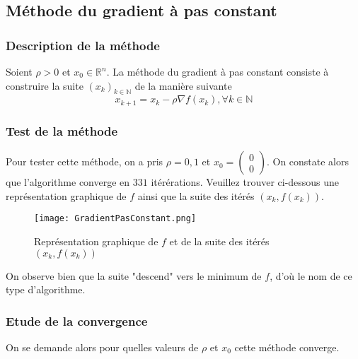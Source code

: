 \documentclass[9pt,a4paper]{article}
\begin{document}
\subsection{Méthode du gradient à pas constant}
\subsubsection{Description de la méthode}
Soient $\rho > 0$ et $x_0 \in \mathbb{R}^n$. La méthode du gradient à pas constant consiste à construire la suite $(x_k)_{k \in \mathbb{N}}$ de la manière suivante
$$
x_{k+1} = x_k - \rho \nabla f(x_k), \forall k \in \mathbb{N}
$$
\subsubsection{Test de la méthode}
Pour tester cette méthode, on a pris $\rho = 0,1$ et $x_0 = 
\begin{pmatrix}
    0\\
    0
\end{pmatrix}$.\newline
On constate alors que l'algorithme converge en $331$ itérérations.\newline
Veuillez trouver ci-dessous une représentation graphique de $f$ ainsi que la suite des itérés $(x_k,f(x_k))$.
\begin{figure}[h]
    \centering
    \texttt{[image: GradientPasConstant.png]}
    \caption{Représentation graphique de $f$ et de la suite des itérés $(x_k,f(x_k))$}
    \label{fig:enter-label}
\end{figure}\newline
On observe bien que la suite "descend" vers le minimum de $f$, d'où le nom de ce type d'algorithme.
\subsubsection{Etude de la convergence}
On se demande alors pour quelles valeurs de $\rho$ et $x_0$ cette méthode converge.
\end{document}
